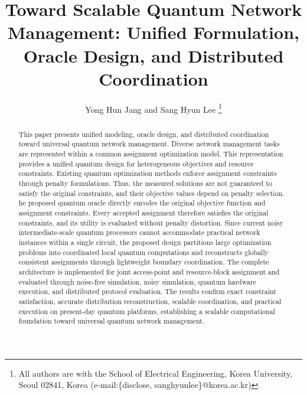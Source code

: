\documentclass[journal]{IEEEtran}
\begin{document}
\title{Toward Scalable Quantum Network Management: Unified Formulation, Oracle Design, and Distributed Coordination}

\author{
 Yong Hun Jang and Sang Hyun Lee
 \thanks{
 All authors are with the School of Electrical Engineering, Korea University, Seoul 02841, Korea (e-mail:\{disclose, sanghyunlee\}@korea.ac.kr)}
}

\maketitle

{\color{violet}
\begin{abstract}
This paper presents unified modeling, oracle design, and distributed coordination toward universal quantum network management. Diverse network management tasks are represented within a common assignment optimization model. This representation provides a unified quantum design for heterogeneous objectives and resource constraints. Existing quantum optimization methods enforce assignment constraints through penalty formulations. Thus, the measured solutions are not guaranteed to satisfy the original constraints, and their objective values depend on penalty selection. he proposed quantum oracle directly encodes the original objective function and assignment constraints. Every accepted assignment therefore satisfies the original constraints, and its utility is evaluated without penalty distortion. Since current noisy intermediate-scale quantum processors cannot accommodate practical network instances within a single circuit, the proposed design partitions large optimization problems into coordinated local quantum computations and reconstructs globally consistent assignments through lightweight boundary coordination. The complete architecture is implemented for joint access-point and resource-block assignment and evaluated through noise-free simulation, noisy simulation, quantum hardware execution, and distributed protocol evaluation. The results confirm exact constraint satisfaction, accurate distribution reconstruction, scalable coordination, and practical execution on present-day quantum platforms, establishing a scalable computational foundation toward universal quantum network management.



\end{abstract}}
\end{document}
